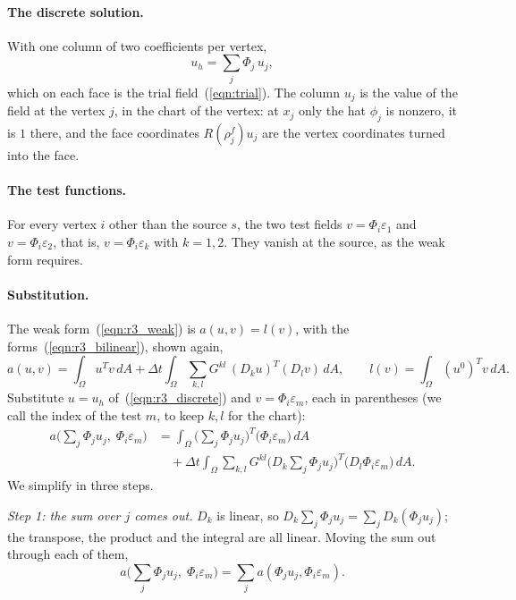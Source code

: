 \paragraph{The discrete solution.} With one column of two coefficients per vertex,
\begin{equation}
\label{eqn:r3_discrete}
u_h = \sum_j \Phi_j\, u_j ,
\end{equation}
which on each face is the trial field~(\ref{eqn:trial}). The column $u_j$ is the value of the field at the vertex $j$, in the chart of the vertex: at $x_j$ only the hat $\phi_j$ is nonzero, it is $1$ there, and the face coordinates $R(\rho_j^f)u_j$ are the vertex coordinates turned into the face.

\paragraph{The test functions.} For every vertex $i$ other than the source $s$, the two test fields $v = \Phi_i\varepsilon_1$ and $v = \Phi_i\varepsilon_2$, that is, $v = \Phi_i\varepsilon_k$ with $k = 1, 2$. They vanish at the source, as the weak form requires.

\paragraph{Substitution.} The weak form~(\ref{eqn:r3_weak}) is $a(u, v) = l(v)$, with the forms~(\ref{eqn:r3_bilinear}), shown again,
\begin{equation*}
a(u, v) = \int_\Omega u^Tv\, dA + \Delta t\int_\Omega \sum_{k,l} G^{kl}\,(D_ku)^T(D_lv)\, dA, \qquad l(v) = \int_\Omega (u^0)^Tv\, dA .
\end{equation*}
Substitute $u = u_h$ of~(\ref{eqn:r3_discrete}) and $v = \Phi_i\varepsilon_m$, each in parentheses (we call the index of the test $m$, to keep $k, l$ for the chart):
\begin{equation*}
\begin{aligned}
a\Big(\sum_j \Phi_ju_j,\; \Phi_i\varepsilon_m\Big) &= \int_\Omega \Big(\sum_j \Phi_ju_j\Big)^T\big(\Phi_i\varepsilon_m\big)\, dA \\
&\quad + \Delta t\int_\Omega \sum_{k,l} G^{kl}\Big(D_k\sum_j \Phi_ju_j\Big)^T\big(D_l\Phi_i\varepsilon_m\big)\, dA .
\end{aligned}
\end{equation*}
We simplify in three steps.

\emph{Step 1: the sum over $j$ comes out.} $D_k$ is linear, so $D_k\sum_j \Phi_ju_j = \sum_j D_k(\Phi_ju_j)$; the transpose, the product and the integral are all linear. Moving the sum out through each of them,
\begin{equation*}
a\Big(\sum_j \Phi_ju_j,\; \Phi_i\varepsilon_m\Big) = \sum_j a(\Phi_ju_j, \Phi_i\varepsilon_m) .
\end{equation*}

